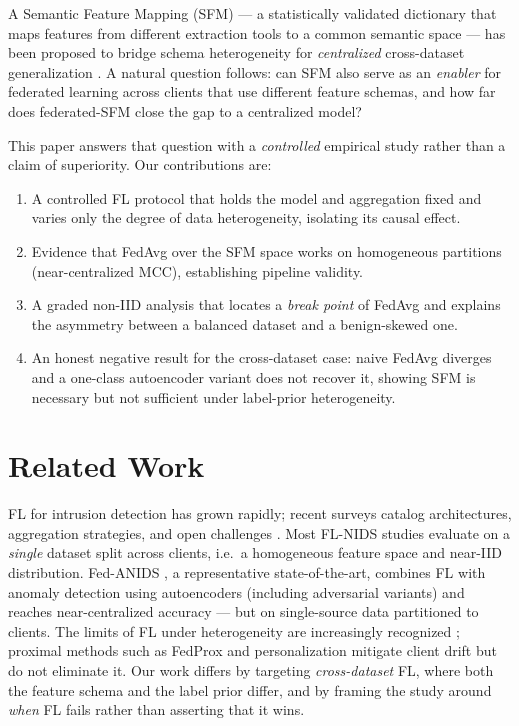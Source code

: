 \documentclass[11pt,a4paper]{article}
\begin{document}
A Semantic Feature Mapping (SFM) --- a statistically validated dictionary that
maps features from different extraction tools to a common semantic space --- has
been proposed to bridge schema heterogeneity for \emph{centralized} cross-dataset
generalization \cite{paper1}. A natural question follows: can SFM also serve as an
\emph{enabler} for federated learning across clients that use different feature
schemas, and how far does federated-SFM close the gap to a centralized model?

This paper answers that question with a \emph{controlled} empirical study rather
than a claim of superiority. Our contributions are:
\begin{enumerate}[leftmargin=1.6em]
  \item A controlled FL protocol that holds the model and aggregation fixed and
  varies only the degree of data heterogeneity, isolating its causal effect.
  \item Evidence that FedAvg over the SFM space works on homogeneous partitions
  (near-centralized MCC), establishing pipeline validity.
  \item A graded non-IID analysis that locates a \emph{break point} of FedAvg and
  explains the asymmetry between a balanced dataset and a benign-skewed one.
  \item An honest negative result for the cross-dataset case: naive FedAvg
  diverges and a one-class autoencoder variant does not recover it, showing SFM is
  necessary but not sufficient under label-prior heterogeneity.
\end{enumerate}

\section{Related Work}
FL for intrusion detection has grown rapidly; recent surveys catalog
architectures, aggregation strategies, and open challenges
\cite{ref-fl-survey,ref-fl-review}. Most FL-NIDS studies evaluate on a
\emph{single} dataset split across clients, i.e.\ a homogeneous feature space and
near-IID distribution. Fed-ANIDS \cite{fedanids}, a representative
state-of-the-art, combines FL with anomaly detection using autoencoders
(including adversarial variants) and reaches near-centralized accuracy --- but on
single-source data partitioned to clients. The limits of FL under heterogeneity
are increasingly recognized \cite{ref-limits,ref-personalized}; proximal methods
such as FedProx \cite{fedprox} and personalization mitigate client drift but do
not eliminate it. Our work differs by targeting \emph{cross-dataset} FL, where
both the feature schema and the label prior differ, and by framing the study
around \emph{when} FL fails rather than asserting that it wins.
\end{document}
